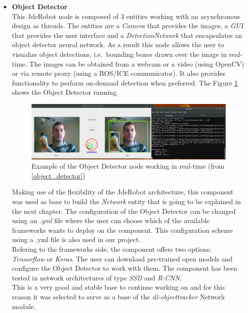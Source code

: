 \begin{itemize}
    \item \textbf{Object Detector}\\
This JdeRobot node is composed of 3 entities working with an asynchronous design as threads. The entities are a \textit{Camera} that provides the images, a \textit{GUI} that provides the user interface and a \textit{DetectionNetwork} that encapsulates an object detector neural network. As a result this node allows the user to visualize object detections, i.e.\ bounding boxes drawn over the image in real-time. The images can be obtained from a webcam or a video (using OpenCV) or via remote proxy (using a ROS/ICE communicator). It also provides functionality to perform on-demand detection when preferred. The Figure \ref{fig:object_detector} shows the Object Detector running.
\begin{figure}[h!]
\begin{center}
\includegraphics[scale=0.25]{figures/object_detector.png}
\caption{Example of the Object Detector node working in real-time (from \ref{object_detector})}
\label{fig:object_detector}
\end{center}
\end{figure}
Making use of the flexibility of the JdeRobot architecture, this component was used as base to build the \textit{Network} entity that is going to be explained in the next chapter. The configuration of the Object Detector can be changed using an \textit{.yml} file where the user can choose which of the available frameworks wants to deploy on the component. This configuration scheme using a .yml file is also used in our project.\\
Refering to the frameworks side, the component offers two options: \textit{Tensorflow} or \textit{Keras}. The user can download pre-trained open models and configure the Object Detector to work with them. The component has been tested in network architectures of type \textit{SSD} and \textit{R-CNN}.\\
This is a very good and stable base to continue working on and for this reason it was selected to serve as a base of the \textit{dl-objecttracker} Network module.

\end{itemize}
